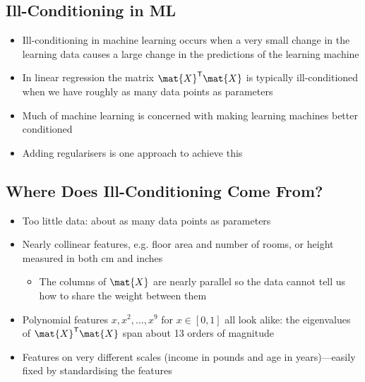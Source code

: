\begin{slide}
\section{Ill-Conditioning in ML}

\begin{PauseHighLight}
  \begin{itemize}
  \item Ill-conditioning in machine learning occurs when a very small
    change in the learning data causes a large change in the predictions
    of the learning machine\pause
  \item In linear regression the matrix $\mat{X}^\tr\mat{X}$ is typically
    ill-conditioned when we have roughly as many data points as parameters\pause
  \item Much of machine learning is concerned with making learning
    machines better conditioned\pause
  \item Adding regularisers is one approach to achieve this\pause
  \end{itemize}
\end{PauseHighLight}

\end{slide}


\begin{slide}
\section[-1]{Where Does Ill-Conditioning Come From?}

\begin{PauseHighLight}
  \begin{itemize}
  \item Too little data: about as many data points as parameters\pause
  \item Nearly collinear features, e.g.{} floor area and number of
    rooms, or height measured in both cm and inches\pause
    \begin{itemize}
    \item The columns of $\mat{X}$ are nearly parallel so the data
      cannot tell us how to share the weight between them\pause
    \end{itemize}
  \item Polynomial features $x, x^2, \ldots, x^9$ for $x\in[0,1]$ all
    look alike: the eigenvalues of $\mat{X}^\tr\mat{X}$ span about
    13 orders of magnitude\pause
  \item Features on very different scales (income in pounds and age in
    years)---easily fixed by standardising the features\pause
  \end{itemize}
\end{PauseHighLight}

\end{slide}

